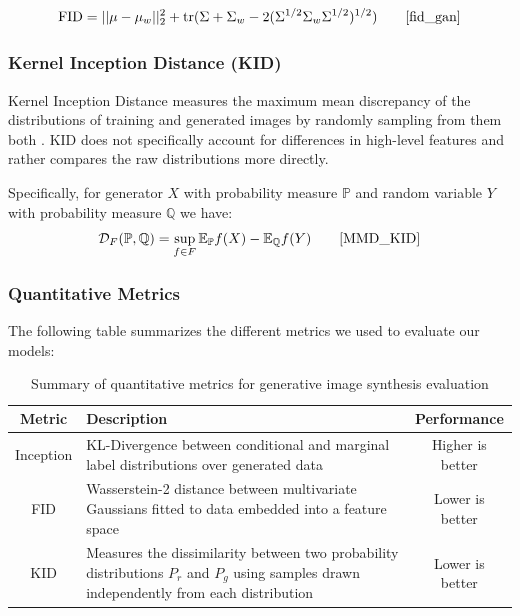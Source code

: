 \documentclass[%
 reprint,
 amsmath,amssymb,
 aps,
]{revtex4-2}
\begin{document}
\begin{equation}
\text{FID}=||\mu -\mu _{w}||_{2}^{2}+\operatorname {tr} (\Sigma +\Sigma _{w}-2(\Sigma ^{1/2}\Sigma _{w}\Sigma ^{1/2})^{1/2})\qquad
\cite{fid_gan}
\end{equation}


\subsubsection{Kernel Inception Distance (KID)}
Kernel Inception Distance measures the maximum mean discrepancy of the distributions of training and generated images by randomly sampling from them both \cite{MMD_KID}. KID does not specifically account for differences in high-level features and rather compares the raw distributions more directly.


Specifically, for generator $X$ with probability measure $\mathbb{P}$ and random variable $Y$ with probability measure $\mathbb{Q}$ we have:
\begin{equation}
\mathcal{D}_F(\mathbb{P},\mathbb{Q}) = \sup_{f\in F}\mathbb{E}_\mathbb{P}f(X) - \mathbb{E}_\mathbb{Q}f(Y)\qquad
\cite{MMD_KID}
\end{equation}

\subsubsection{Quantitative Metrics}
The following table summarizes the different metrics we used to evaluate our models:
\begin{table}[h]
\caption{\label{tab:metrics}
Summary of quantitative metrics for generative image synthesis evaluation \cite{isscore} \cite{fid_gan} \cite{MMD_KID}} 
\begin{ruledtabular}
    \begin{tabular}{cp{4cm}c}
         Metric& Description &Performance\\ \hline 
 Inception & KL-Divergence between conditional and marginal label distributions over generated data & Higher is better\\ \hline
 FID & Wasserstein-2 distance between multivariate Gaussians fitted to data embedded into a feature space & Lower is better\\ \hline
 KID & Measures the dissimilarity between two probability distributions $P_r$ and $P_g$ using samples drawn independently from each distribution & Lower is better\\
    \end{tabular}
\end{ruledtabular}
\end{table}
\end{document}

